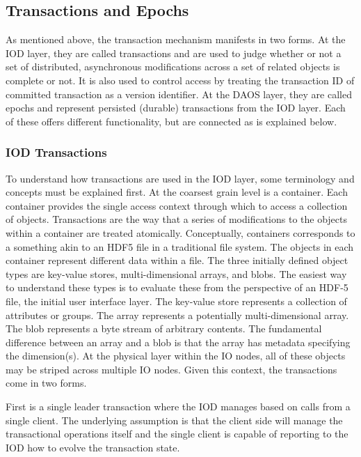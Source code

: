\documentclass[conference]{IEEEtran}
\newcommand{\DDT}{D\textsuperscript{2}T~}
\newcommand{\DDTns}{D\textsuperscript{2}T}
\begin{document}
\subsection{Transactions and Epochs}
\label{sec:transactions}

As mentioned above, the transaction mechanism manifests in two forms. At the
IOD layer, they are called transactions and are used to judge whether or not a
set of distributed, asynchronous modifications across a set of related objects
is complete or not.  It is also used to control access by treating the
transaction ID of committed transaction as a version identifier.  At the DAOS
layer, they are called epochs and represent persisted (durable) transactions
from the IOD layer. Each of these offers different functionality, but are
connected as is explained below.

\subsubsection{IOD Transactions}
To understand how transactions are used in the IOD layer, some terminology and
concepts must be explained first. At the coarsest grain level is a container.
Each container provides the single access context through which to access a
collection of objects. Transactions are the way that a series of modifications
to the objects within a container are treated atomically. Conceptually,
containers corresponds to a something akin to an HDF5 file in a traditional
file system. The objects in each container represent different data within a
file.  The three initially defined object types are key-value stores,
multi-dimensional arrays, and blobs.  The easiest way to understand these types
is to evaluate these from the perspective of an HDF-5 file, the initial user
interface layer. The key-value store represents a collection of attributes or
groups. The array represents a potentially multi-dimensional array.  The blob
represents a byte stream of arbitrary contents.  The fundamental difference
between an array and a blob is that the array has metadata specifying the
dimension(s). At the physical layer within the IO nodes, all of these objects
may be striped across multiple IO nodes.  Given this context, the transactions
come in two forms.

First is a single leader transaction where the IOD manages based on calls from
a single client. The underlying assumption is that the client side will manage
the transactional operations itself and the single client is capable of
reporting to the IOD how to evolve the transaction state. 
\end{document}
